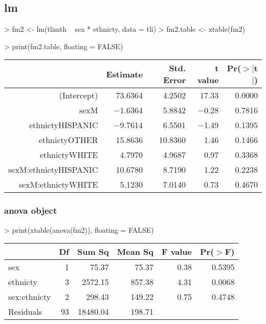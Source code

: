 \documentclass[letterpaper]{article}
\begin{document}
\subsection{lm}
\begin{Schunk}
\begin{Sinput}
> fm2 <- lm(tlimth ~ sex * ethnicty, data = tli)
> fm2.table <- xtable(fm2)
\end{Sinput}
\end{Schunk}
\begin{Schunk}
\begin{Sinput}
> print(fm2.table, floating = FALSE)
\end{Sinput}
% latex table generated in R 2.6.0 by xtable 1.5-2 package
% Wed Oct 10 14:26:36 2007
\begin{tabular}{rrrrr}
  \hline
 & Estimate & Std. Error & t value & Pr($>$$|$t$|$) \\
  \hline
(Intercept) & 73.6364 & 4.2502 & 17.33 & 0.0000 \\
  sexM & $-$1.6364 & 5.8842 & $-$0.28 & 0.7816 \\
  ethnictyHISPANIC & $-$9.7614 & 6.5501 & $-$1.49 & 0.1395 \\
  ethnictyOTHER & 15.8636 & 10.8360 & 1.46 & 0.1466 \\
  ethnictyWHITE & 4.7970 & 4.9687 & 0.97 & 0.3368 \\
  sexM:ethnictyHISPANIC & 10.6780 & 8.7190 & 1.22 & 0.2238 \\
  sexM:ethnictyWHITE & 5.1230 & 7.0140 & 0.73 & 0.4670 \\
   \hline
\end{tabular}\end{Schunk}
\subsubsection{anova object}

\begin{Schunk}
\begin{Sinput}
> print(xtable(anova(fm2)), floating = FALSE)
\end{Sinput}
% latex table generated in R 2.6.0 by xtable 1.5-2 package
% Wed Oct 10 14:26:36 2007
\begin{tabular}{lrrrrr}
  \hline
 & Df & Sum Sq & Mean Sq & F value & Pr($>$F) \\
  \hline
sex & 1 & 75.37 & 75.37 & 0.38 & 0.5395 \\
  ethnicty & 3 & 2572.15 & 857.38 & 4.31 & 0.0068 \\
  sex:ethnicty & 2 & 298.43 & 149.22 & 0.75 & 0.4748 \\
  Residuals & 93 & 18480.04 & 198.71 &  &  \\
   \hline
\end{tabular}\end{Schunk}
\end{document}
